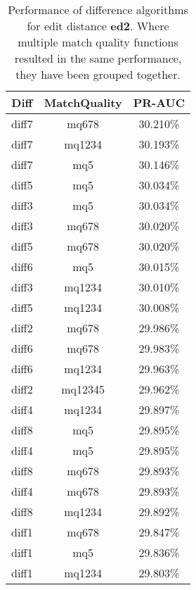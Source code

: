 \begin{table}[tbph]
\begin{center}
\begin{tabular}{|c|c||c|}
\hline
Diff & MatchQuality & PR-AUC  \\
\hline
\hline
diff7 & mq678 & 30.210\% \\
diff7 & mq1234 & 30.193\% \\
diff7 & mq5 & 30.146\% \\
diff5 & mq5 & 30.034\% \\
diff3 & mq5 & 30.034\% \\
diff3 & mq678 & 30.020\% \\
diff5 & mq678 & 30.020\% \\
diff6 & mq5 & 30.015\% \\
diff3 & mq1234 & 30.010\% \\
diff5 & mq1234 & 30.008\% \\
diff2 & mq678 & 29.986\% \\
diff6 & mq678 & 29.983\% \\
diff6 & mq1234 & 29.963\% \\
diff2 & mq12345 & 29.962\% \\
diff4 & mq1234 & 29.897\% \\
diff8 & mq5 & 29.895\% \\
diff4 & mq5 & 29.895\% \\
diff8 & mq678 & 29.893\% \\
diff4 & mq678 & 29.893\% \\
diff8 & mq1234 & 29.892\% \\
diff1 & mq678 & 29.847\% \\
diff1 & mq5 & 29.836\% \\
diff1 & mq1234 & 29.803\% \\
\hline
\end{tabular}
\end{center}
\caption{Performance of difference algorithms for
  edit distance \textbf{ed2}.  Where multiple match
  quality functions resulted in the same performance, they
  have been grouped together.}
\label{tab:editlongbyed2}
\end{table}
